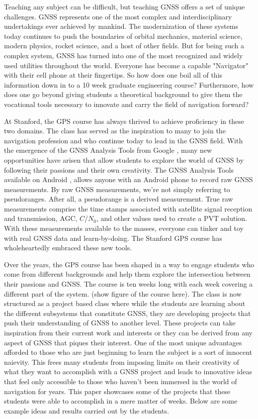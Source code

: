 \documentclass[12pt, conference, onecolumn, draftclsnofoot]{IEEEtran}
\begin{document}
Teaching any subject can be difficult, but teaching GNSS offers a set of unique challenges.
GNSS represents one of the most complex and interdisciplinary undertakings ever achieved by mankind.
The modernization of these systems today continues to push the boundaries of orbital mechanics, material science, modern physics, rocket science, and a host of other fields.
But for being such a complex system, GNSS has turned into one of the most recognized and widely used utilities throughout the world.
Everyone has become a capable "Navigator" with their cell phone at their fingertips.
So how does one boil all of this information down in to a 10 week graduate engineering course?
Furthermore, how does one go beyond giving students a theoretical background to give them the vocational tools necessary to innovate and carry the field of navigation forward?

At Stanford, the GPS course has always thrived to achieve proficiency in these two domains.
The class has served as the inspiration to many to join the navigation profession and who continue today to lead in the GNSS field.
With the emergence of the GNSS Analysis Tools from Google \cite{vanDiggelen2018}, many new opportunities have arisen that allow students to explore the world of GNSS by following their passions and their own creativity.
The GNSS Analysis Tools available on Android \cite{GNSSAnalysisTools}, allows anyone with an Android phone to record raw GNSS measurements.
By raw GNSS measurements, we're not simply referring to pseudoranges.
After all, a pseudorange is a derived measurement.
True raw measurements comprise the time stamps associated with satellite signal reception and transmission, AGC, $C$/$N_0$, and other values used to create a PVT solution.
With these measurements available to the masses, everyone can tinker and toy with real GNSS data and learn-by-doing.
The Stanford GPS course has wholeheartedly embraced these new tools.

Over the years, the GPS course has been shaped in a way to engage students who come from different backgrounds and help them explore the intersection between their passions and GNSS.
The course is ten weeks long with each week covering a different part of the system. (show figure of the course here).
The class is now structured as a project based class where while the students are learning about the different subsystems that constitute GNSS, they are developing projects that push their understanding of GNSS to another level.
These projects can take inspiration from their current work and interests or they can be derived from any aspect of GNSS that piques their interest.
One of the most unique advantages afforded to those who are just beginning to learn the subject is a sort of innocent naievity.
This frees many students from imposing limits on their creativity of what they want to accomplish with a GNSS project and leads to innovative ideas that feel only accessible to those who haven't been immersed in the world of navigation for years. 
This paper showcases some of the projects that these students were able to accomplish in a mere matter of weeks.
Below are some example ideas and results carried out by the students.
\end{document}
